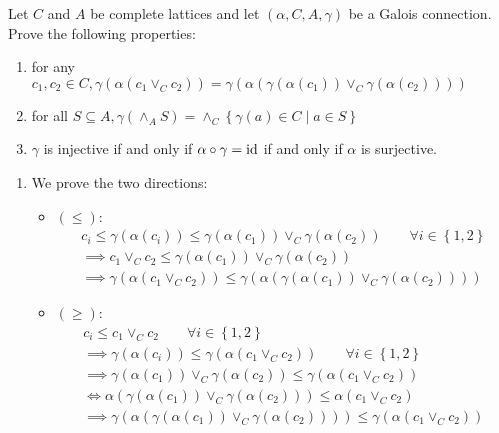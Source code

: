 \begin{exercise}{
    Let $C$ and $A$ be complete lattices and let $(\alpha, C, A, \gamma)$ be a Galois connection. Prove the following properties:
    \begin{enumerate}[(1)]
        \item for any $c_1, c_2 \in C, \gamma(\alpha(c_1 \vee_C c_2)) = \gamma(\alpha(\gamma(\alpha(c_1)) \vee_C \gamma(\alpha(c_2))))$
        \item for all $S \subseteq A, \gamma(\wedge_A S) = \wedge_C \left\{\gamma(a) \in C \mid a \in S \right\}$
        \item $\gamma$ is injective if and only if $\alpha \circ \gamma = \operatorname{id}$ if and only if $\alpha$ is surjective.
    \end{enumerate}
}
    \begin{enumerate}[(1)]
        \item We prove the two directions:
        \begin{itemize}
            \item $(\leq)$:
            \begin{gather*}
                c_i \leq \gamma(\alpha(c_i)) \leq \gamma(\alpha(c_1)) \vee_C \gamma(\alpha(c_2)) \quad\quad \forall i \in \left\{ 1, 2 \right\} \\
                \implies c_1 \vee_C c_2 \leq \gamma(\alpha(c_1)) \vee_C \gamma(\alpha(c_2)) \\
                \implies \gamma(\alpha(c_1 \vee_C c_2)) \leq \gamma(\alpha(\gamma(\alpha(c_1)) \vee_C \gamma(\alpha(c_2))))
            \end{gather*}
            \item $(\geq)$:
            \begin{gather*}
                c_i \leq c_1 \vee_C c_2 \quad\quad \forall i \in \left\{ 1, 2 \right\} \\
                \implies \gamma(\alpha(c_i)) \leq \gamma(\alpha(c_1 \vee_C c_2)) \quad\quad \forall i \in \left\{ 1, 2 \right\} \\
                \implies \gamma(\alpha(c_1)) \vee_C \gamma(\alpha(c_2)) \leq \gamma(\alpha(c_1 \vee_C c_2)) \\
                \iff \alpha(\gamma(\alpha(c_1)) \vee_C \gamma(\alpha(c_2))) \leq \alpha(c_1 \vee_C c_2) \\
                \implies \gamma(\alpha(\gamma(\alpha(c_1)) \vee_C \gamma(\alpha(c_2)))) \leq \gamma(\alpha(c_1 \vee_C c_2))
            \end{gather*}
        \end{itemize}

\end{enumerate}
\end{exercise}
